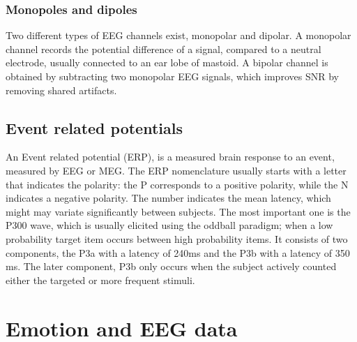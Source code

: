 
\subsubsection{Monopoles and dipoles}
Two different types of EEG channels exist, monopolar and dipolar. A monopolar channel records the potential difference of a signal, compared to a neutral electrode, usually connected to an ear lobe of mastoid. A bipolar channel is obtained by subtracting two monopolar EEG signals, which improves SNR by removing shared artifacts\cite{MonoBiPolar}. 

\subsection{Event related potentials}

An Event related potential (ERP), is a measured brain response to an event, measured by EEG or MEG. The ERP nomenclature usually starts with a letter that indicates the polarity: the P corresponds to a positive polarity, while the N indicates a negative polarity. The number indicates the mean latency, which might may variate significantly between subjects. The most important one is the P300 wave, which is usually elicited using the oddball paradigm; when a low probability target item occurs between high probability items. It consists of two components, the P3a with a latency of 240ms and the P3b with a latency of 350 ms\cite{P300TwoParts}. The later component, P3b only occurs when the subject actively counted either the targeted or more frequent stimuli.



\section{Emotion and EEG data}

